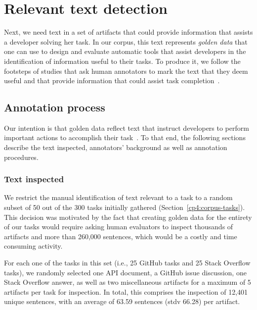 \clearpage


\section{Relevant text detection}
\label{cp4:corpus-relevant-text}




Next, we need text in a set of artifacts that could provide information that assists a developer solving her task.
In our corpus, this text represents \textit{golden data} that one can use to design and evaluate  
automatic tools that assist developers in the identification of  information useful to their tasks. 
To produce it, we follow the footsteps of studies that 
ask human annotators to
mark the text that they deem useful and that provide information that could assist task completion~\cite{nadi2020, Robillard2015, marques2020}.



\subsection{Annotation process}


Our intention is that golden data reflect text that instruct developers to perform important actions to accomplish their task~\cite{Robillard2015, Lotufo2012}.
To that end, the following sections describe the text inspected, annotators' background as well as annotation procedures.




\subsubsection{Text inspected}




We restrict the manual identification of text relevant to a task to a random subset of 
50  out of the 300  tasks initially gathered (Section~\ref{cp4:corpus-tasks}).
This decision was motivated by the fact that 
creating golden data for the entirety of our tasks 
would require asking human evaluators to inspect thousands of artifacts and more than 260,000 sentences, which would be a costly and time consuming activity. 



For each one of the tasks in this set (i.e., 25 GitHub tasks and 25 Stack Overflow tasks), we randomly selected 
one API document, a GitHub issue discussion, one Stack Overflow answer, as well as two  miscellaneous artifacts for a maximum of 5 artifacts per task for inspection.
In total, this comprises the inspection of  
12,401 unique sentences, with an average of 63.59 sentences (stdv 66.28) per artifact.



